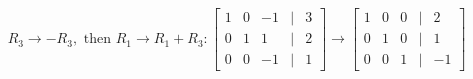 \documentclass[preview]{standalone}
\begin{document}
\begin{align*}
R_3 \rightarrow -R_3, \text{ then } R_1 \rightarrow R_1 + R_3: \begin{bmatrix} 1 & 0 & -1 & | & 3 \\ 0 & 1 & 1 & | & 2 \\ 0 & 0 & -1 & | & 1 \end{bmatrix} \rightarrow \begin{bmatrix} 1 & 0 & 0 & | & 2 \\ 0 & 1 & 0 & | & 1 \\ 0 & 0 & 1 & | & -1 \end{bmatrix}
\end{align*}
\end{document}
